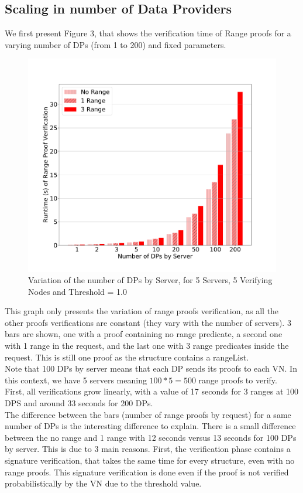 \documentclass{article}
\begin{document}
\subsection{Scaling in number of Data Providers}
We first present Figure 3, that shows the verification time of Range proofs for a varying number of DPs (from 1 to 200) and fixed parameters.
\begin{figure}[H]
\includegraphics[scale=0.5]{variationInDPRange}
\caption{Variation of the number of DPs by Server, for 5 Servers, 5 Verifying Nodes and Threshold = 1.0}
\end{figure}
This graph only presents the variation of range proofs verification, as all the other proofs verifications are constant (they vary with the number of servers). 3 bars are shown, one with a proof containing no range predicate, a second one with 1 range in the request, and the last one with 3 range predicates inside the request. This is still one proof as the structure contains a rangeList.\\
Note that 100 DPs by server means that each  DP sends its proofs to each VN. In this context, we have 5 servers meaning $100*5 = 500$ range proofs to verify.\\
First, all verifications grow linearly, with a value of 17 seconds for 3 ranges at 100 DPS and around 33 seconds for 200 DPs.\\
The difference between the bars (number of range proofs by request) for a same number of DPs is the interesting difference to explain. There is a small difference between the no range and 1 range with 12 seconds versus 13 seconds for 100 DPs by server. This is due to 3 main reasons. First, the verification phase contains a signature verification, that takes the same time for every structure, even with no range proofs. This signature verification is done even if the proof is not verified probabilistically by the VN due to the threshold value.\\
\end{document}
